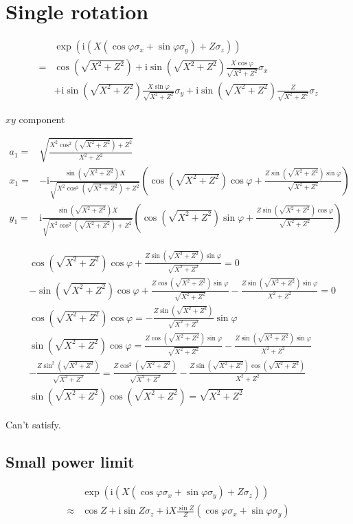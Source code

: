 \documentclass[10pt,fleqn]{article}
\newcommand{\ui}{\mathrm{i}}
\newcommand{\eqar}[1]
{
  \begin{align*}
    #1
  \end{align*}
}
\newcommand{\paren}[1]{{\left({#1}\right)}}
\begin{document}
\section{Single rotation}
\eqar{
  &\exp\paren{\ui\paren{X\paren{\cos\varphi\sigma_x+\sin\varphi\sigma_y}+Z\sigma_z}}\\
  =&\cos\paren{\sqrt{X^2+Z^2}}+\ui\sin\paren{\sqrt{X^2+Z^2}}\frac{X\cos\varphi}{\sqrt{X^2+Z^2}}\sigma_x\\
  &+\ui\sin\paren{\sqrt{X^2+Z^2}}\frac{X\sin\varphi}{\sqrt{X^2+Z^2}}\sigma_y+\ui\sin\paren{\sqrt{X^2+Z^2}}\frac{Z}{\sqrt{X^2+Z^2}}\sigma_z
}
$xy$ component
\eqar{
  a_1=&\sqrt{\frac{X^2\cos^2\paren{\sqrt{X^2+Z^2}}+Z^2}{X^2+Z^2}}\\
  x_1=&-\ui\frac{\sin\paren{\sqrt{X^2+Z^2}}X}{\sqrt{X^2\cos^2\paren{\sqrt{X^2+Z^2}}+Z^2}}\paren{\cos\paren{\sqrt{X^2+Z^2}}\cos\varphi+\frac{Z\sin\paren{\sqrt{X^2+Z^2}}\sin\varphi}{\sqrt{X^2+Z^2}}}\\
  y_1=&\ui\frac{\sin\paren{\sqrt{X^2+Z^2}}X}{\sqrt{X^2\cos^2\paren{\sqrt{X^2+Z^2}}+Z^2}}\paren{
    \cos\paren{\sqrt{X^2+Z^2}}\sin\varphi
    +\frac{Z\sin\paren{\sqrt{X^2+Z^2}}\cos\varphi}{\sqrt{X^2+Z^2}}
  }
}
\eqar{
  &\cos\paren{\sqrt{X^2+Z^2}}\cos\varphi+\frac{Z\sin\paren{\sqrt{X^2+Z^2}}\sin\varphi}{\sqrt{X^2+Z^2}}=0\\
  &-\sin\paren{\sqrt{X^2+Z^2}}\cos\varphi+\frac{Z\cos\paren{\sqrt{X^2+Z^2}}\sin\varphi}{\sqrt{X^2+Z^2}}-\frac{Z\sin\paren{\sqrt{X^2+Z^2}}\sin\varphi}{X^2+Z^2}=0\\
  &\cos\paren{\sqrt{X^2+Z^2}}\cos\varphi=-\frac{Z\sin\paren{\sqrt{X^2+Z^2}}}{\sqrt{X^2+Z^2}}\sin\varphi\\
  &\sin\paren{\sqrt{X^2+Z^2}}\cos\varphi=\frac{Z\cos\paren{\sqrt{X^2+Z^2}}\sin\varphi}{\sqrt{X^2+Z^2}}-\frac{Z\sin\paren{\sqrt{X^2+Z^2}}\sin\varphi}{X^2+Z^2}\\
  &-\frac{Z\sin^2\paren{\sqrt{X^2+Z^2}}}{\sqrt{X^2+Z^2}}=\frac{Z\cos^2\paren{\sqrt{X^2+Z^2}}}{\sqrt{X^2+Z^2}}-\frac{Z\sin\paren{\sqrt{X^2+Z^2}}\cos\paren{\sqrt{X^2+Z^2}}}{X^2+Z^2}\\
  &\sin\paren{\sqrt{X^2+Z^2}}\cos\paren{\sqrt{X^2+Z^2}}=\sqrt{X^2+Z^2}
}
Can't satisfy.

\subsection{Small power limit}
\eqar{
  &\exp\paren{\ui\paren{X\paren{\cos\varphi\sigma_x+\sin\varphi\sigma_y}+Z\sigma_z}}\\
  \approx&\cos Z+\ui\sin Z\sigma_z+\ui X\frac{\sin Z}{Z}\paren{\cos\varphi\sigma_x+\sin\varphi\sigma_y}
}
\end{document}
